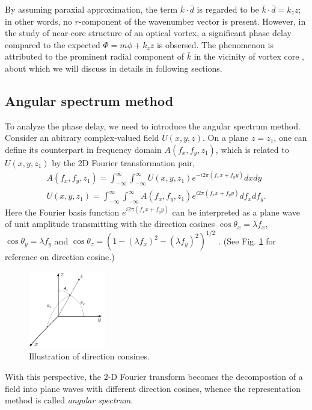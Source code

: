By assuming paraxial approximation, the term $\bar{k} \cdot \bar{d}$ is regarded to be $\bar{k} \cdot \bar{d} = k_z z$; in other words, no $r$-component of the wavenumber vector is present. However, in the study of near-core structure of an optical vortex, a significant phase delay compared to the expected $\Phi = m\phi + k_z z$ is obsersed. The phenomenon is attributed to the prominent radial component of $\bar{k}$ in the vicinity of vortex core \cite{Near16}, about which we will discuss in details in following sections.

\subsection{Angular spectrum method}

To analyze the phase delay, we need to introduce the angular spectrum method. Consider an abitrary complex-valued field $U(x, y, z)$. On a plane $z = z_1$, one can define its counterpart in frequency domain $A(f_x, f_y, z_1)$, which is related to $U(x, y, z_1)$ by the 2D Fourier transformation pair,
\begin{eqnarray}
	A(f_x, f_y, z_1) = \int_{-\infty}^{\infty} \int_{-\infty}^{\infty} U(x, y, z_1)
	e^{-i 2 \pi (f_x x + f_y y)} dx dy
	\nonumber\\
	U(x, y, z_1) = \int_{-\infty}^{\infty} \int_{-\infty}^{\infty} A(f_x, f_y, z_1)
	e^{i 2 \pi (f_x x + f_y y)} df_x df_y.
	\nonumber
\end{eqnarray}
Here the Fourier basis function $e^{i2\pi (f_x x + f_y y)}$ can be interpreted as a plane wave of unit amplitude transmitting with the direction cosines $\cos\theta_x = \lambda f_x$, $\cos\theta_y = \lambda f_y$ and $\cos\theta_z = (1 - (\lambda f_x)^2 - (\lambda f_y)^2)^{1/2}$ \cite{Fo04}. (See Fig. \ref{fig:dirc_cos} for reference on direction cosine.)
\begin{figure}
	\centering
	\includegraphics[width = 0.3\textwidth]{direction_cosines.jpg}
	\caption{Illustration of direction consines.}
	\label{fig:dirc_cos}
\end{figure}
With this perspective, the 2-D Fourier transform becomes the decompostion of a field into plane waves with different direction cosines, whence the representation method is called {\em angular spectrum}.


